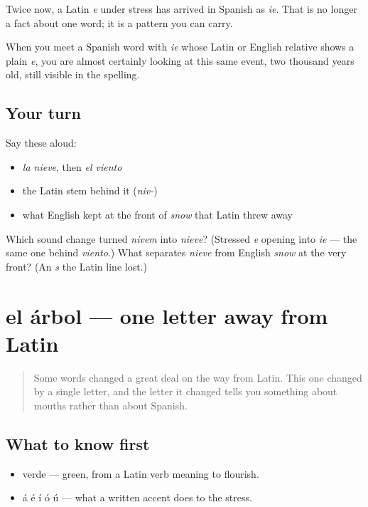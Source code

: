 \begin{grammarlens}[title={What you've built}]
Twice now, a Latin \emph{e} under stress has arrived in Spanish as \emph{ie}. That is no longer a fact about one word; it is a pattern you can carry.

When you meet a Spanish word with \emph{ie} whose Latin or English relative shows a plain \emph{e}, you are almost certainly looking at this same event, two thousand years old, still visible in the spelling.
\end{grammarlens}

\subsection*{Your turn}
Say these aloud:

\begin{itemize}
\raggedright
  \item \emph{la nieve}, then \emph{el viento}
  \item the Latin stem behind it (\emph{niv-})
  \item what English kept at the front of \emph{snow} that Latin threw away
\end{itemize}

\begin{tcolorbox}[breakable,colback=teal!4,colframe=teal!35!black,title={Before you move on}]
Which sound change turned \emph{nivem} into \emph{nieve}? (Stressed \emph{e} opening into \emph{ie} — the same one behind \emph{viento}.) What separates \emph{nieve} from English \emph{snow} at the very front? (An \emph{s} the Latin line lost.)
\end{tcolorbox}
\section[el árbol]{el árbol — one letter away from Latin}

\label{lesson:ES-C278-arbol}



\begin{quote}
Some words changed a great deal on the way from Latin. This one changed by a single letter, and the letter it changed tells you something about mouths rather than about Spanish.
\end{quote}

\subsection*{What to know first}
\begin{itemize}
\raggedright
  \item verde — green, from a Latin verb meaning to flourish.
  \item á é í ó ú — what a written accent does to the stress.
\end{itemize}

